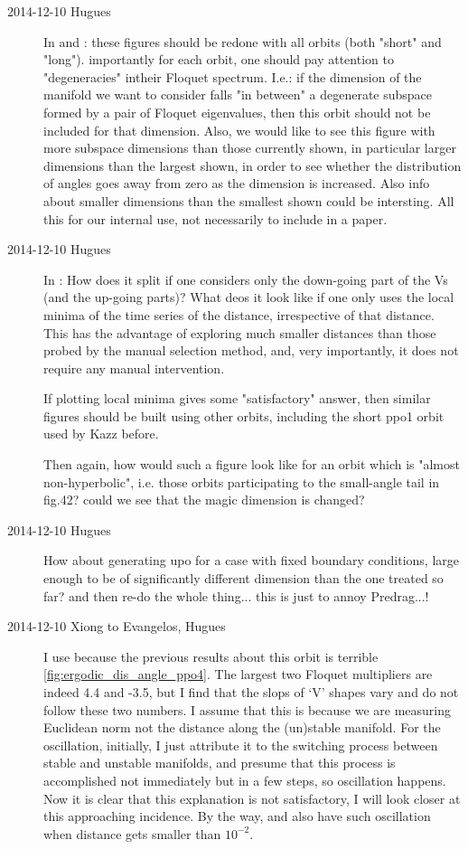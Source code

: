 \begin{description}
\item[2014-12-10 Hugues] In  and :
these figures should be redone with all orbits (both "short" and "long").
importantly for each orbit, one should pay attention to "degeneracies" intheir
Floquet spectrum. I.e.: if the dimension of the manifold we want to consider falls
"in between" a degenerate subspace formed by a pair of Floquet eigenvalues, then
this orbit should not be included for that dimension. Also, we would like to see
this figure with more subspace dimensions than those currently shown, in particular
larger dimensions than the largest shown, in order to see whether the distribution
of angles goes away from zero as the dimension is increased. Also info about smaller
dimensions than the smallest shown could be intersting. All this for our internal
use, not necessarily to include in a paper.

\item[2014-12-10 Hugues] In :
How does it split if one considers only the down-going part of the Vs (and the
up-going parts)? What deos it look like if one only uses the local minima of the
time series of the distance, irrespective of that distance. This has the advantage
of exploring much smaller distances than those probed by the manual selection
method, and, very importantly, it does not require any manual intervention.

If plotting local minima gives some "satisfactory" answer, then similar figures
should be built using other orbits, including the short ppo1 orbit used by Kazz
before.

Then again, how would such a figure look like for an orbit which is "almost
non-hyperbolic", i.e. those orbits participating to the small-angle tail in fig.42?
could we see that the magic dimension is changed?


\item[2014-12-10 Hugues]
How about generating upo for a case with fixed boundary conditions, large enough to
be of significantly different dimension than the one treated so far? and then re-do
the whole thing... this is just to annoy Predrag...!


\item[2014-12-10 Xiong to Evangelos, Hugues]
I use  because the previous results about this
orbit is terrible \ref{fig:ergodic_dis_angle_ppo4}. The
largest two Floquet multipliers are indeed 4.4 and -3.5,
but I find that the slops of `V' shapes vary and do not
follow these two numbers. I assume that this is because
we are measuring Euclidean norm not the distance along the
(un)stable manifold. For the oscillation, initially, I
just attribute it to the switching process between stable and unstable
manifolds, and presume that this process is accomplished
not immediately but in a few steps, so oscillation happens.
Now it is clear  that this explanation is not satisfactory,
I will look closer at this approaching incidence. By the way,
 and  also have such oscillation when
distance gets smaller than $10^{-2}$.


\end{description}
